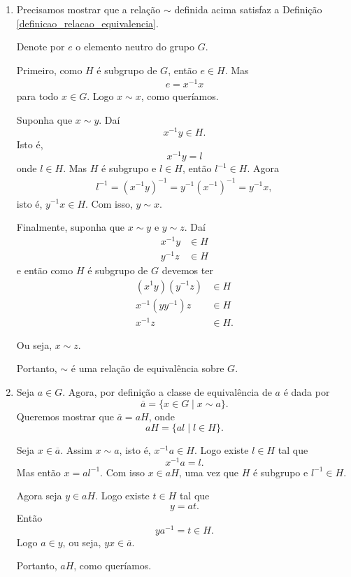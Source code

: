 \begin{prova}
    \begin{enumerate}[label={\roman*})]
        \item Precisamos mostrar que a relação $\sim$ definida acima satisfaz a Definição \eqref{definicao_relacao_equivalencia}.

        Denote por $e$ o elemento neutro do grupo $G$.

        Primeiro, como $H$ é subgrupo de $G$, então $e \in H$. Mas
        \begin{align*}
            e = x^{-1}x
        \end{align*}
        para todo $x \in G$. Logo $x \sim x$, como queríamos.

        Suponha que $x \sim y$. Daí
        \[
            x^{-1}y \in H.
        \]
        Isto é,
        \[
            x^{-1}y = l
        \]
        onde $l \in H$. Mas $H$ é subgrupo e $l \in H$, então $l^{-1} \in H$. Agora
        \begin{align*}
            l^{-1} = (x^{-1}y)^{-1} = y^{-1}(x^{-1})^{-1} = y^{-1}x,
        \end{align*}
        isto é, $y^{-1}x \in H$. Com isso, $y \sim x$.

        Finalmente, suponha que $x \sim y$ e $y \sim z$. Daí
        \begin{align*}
            x^{-1}y &\in H\\
            y^{-1}z &\in H
        \end{align*}
        e então como $H$ é subgrupo de $G$ devemos ter
        \begin{align*}
            (x^{1}y)(y^{-1}z) &\in H\\
            x^{-1}(yy^{-1})z &\in H\\
            x^{-1}z &\in H.
        \end{align*}

        Ou seja, $x \sim z$.

        Portanto, $\sim$ é uma relação de equivalência sobre $G$.

        \item Seja $a \in G$. Agora, por definição a classe de equivalência de $a$ é dada por
        \[
            \overline{a} = \{ x \in G \mid x \sim a\}.
        \]
        Queremos mostrar que $\overline{a} = aH$, onde
        \[
            aH = \{al \mid l \in H\}.
        \]

        Seja $x \in \overline{a}$. Assim $x \sim a$, isto é, $x^{-1}a \in H$. Logo existe $l \in H$ tal que
        \[
            x^{-1}a = l.
        \]
        Mas então $x = al^{-1}$. Com isso $x \in aH$, uma vez que $H$ é subgrupo e $l^{-1} \in H$.

        Agora seja $y \in aH$. Logo existe $t \in H$ tal que
        \[
            y = at.
        \]
        Então
        \[
            ya^{-1} = t \in H.
        \]
        Logo $a \in y$, ou seja, $yx \in \overline{a}$.

        Portanto, $aH$, como queríamos.
    \end{enumerate}
\end{prova}

